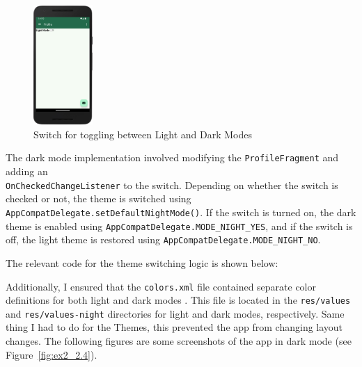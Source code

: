     \begin{figure}[H]
        \centering
        \includegraphics[width=0.2\textwidth]{res/img/dark_theme_switch.png}
        \caption{Switch for toggling between Light and Dark Modes}
        \label{fig:ex2_3}
    \end{figure}

    The dark mode implementation involved modifying the \texttt{ProfileFragment} and adding an \\ \texttt{OnCheckedChangeListener} to the switch. Depending on whether the switch is checked or not, the theme is switched using \texttt{AppCompatDelegate.setDefaultNightMode()}. If the switch is turned on, the dark theme is enabled using \texttt{AppCompatDelegate.MODE\_NIGHT\_YES}, and if the switch is off, the light theme is restored using \texttt{AppCompatDelegate.MODE\_NIGHT\_NO}.

    The relevant code for the theme switching logic is shown below:

    

    Additionally, I ensured that the \texttt{colors.xml} file contained separate color definitions for both light and dark modes . This file is located in the \texttt{res/values} and \texttt{res/values-night} directories for light and dark modes, respectively. Same thing I had to do for the Themes, this prevented the app from changing layout changes. The following figures are some screenshots of the app in dark mode (see Figure~\ref{fig:ex2_2.4}).

